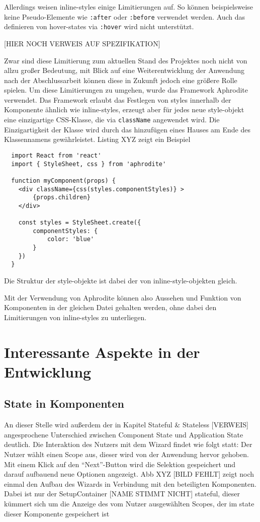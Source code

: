 Allerdings weisen inline-styles einige Limitierungen auf. So können beispielsweise keine Pseudo-Elemente wie \verb|:after| oder \verb|:before| verwendet werden. Auch das definieren von hover-states via \verb|:hover| wird nicht unterstützt.

[HIER NOCH VERWEIS AUF SPEZIFIKATION]

Zwar sind diese Limitierung zum aktuellen Stand des Projektes noch nicht von allzu großer Bedeutung, mit Blick auf eine Weiterentwicklung der Anwendung nach der Abschlussarbeit können diese in Zukunft jedoch eine größere Rolle spielen.
Um diese  Limitierungen zu umgehen, wurde das Framework Aphrodite verwendet. Das Framework erlaubt das Festlegen von styles innerhalb der Komponente ähnlich wie inline-styles, erzeugt aber für jedes neue style-objekt eine einzigartige CSS-Klasse, die via \verb|className| angewendet wird. Die Einzigartigkeit der Klasse wird durch das hinzufügen eines Hauses am Ende des Klassennamens gewährleistet.  Listing XYZ zeigt ein Beispiel

\begin{lstlisting}
  import React from 'react'
  import { StyleSheet, css } from 'aphrodite'

  function myComponent(props) {
  	<div className={css(styles.componentStyles)} >
  		{props.children}
  	</div>

  	const styles = StyleSheet.create({
  		componentStyles: {
  			color: 'blue'
  		}
  	})
  }
\end{lstlisting}

Die Struktur der style-objekte ist dabei der von inline-style-objekten gleich.

Mit der Verwendung von Aphrodite können also Aussehen und Funktion von Komponenten in der gleichen Datei gehalten werden, ohne dabei den Limitierungen von inline-styles zu unterliegen.


\section{Interessante Aspekte in der Entwicklung}

\subsection{State in Komponenten}
An dieser Stelle wird außerdem der in Kapitel Stateful \& Stateless [VERWEIS] angesprochene Unterschied zwischen Component State und Application State deutlich. Die Interaktion des Nutzers mit dem Wizard findet wie folgt statt: Der Nutzer wählt einen Scope aus, dieser wird von der Anwendung hervor gehoben. Mit einem Klick auf den “Next”-Button wird die Selektion gespeichert und darauf aufbauend neue Optionen angezeigt.
Abb XYZ [BILD FEHLT] zeigt noch einmal den Aufbau des Wizards in Verbindung mit den beteiligten Komponenten. Dabei ist nur der SetupContainer [NAME STIMMT NICHT] stateful, dieser kümmert sich um die Anzeige des vom Nutzer ausgewählten Scopes, der im state dieser Komponente gespeichert ist

